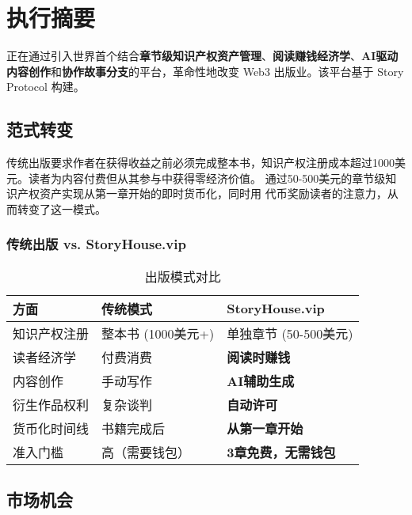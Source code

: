 \section{执行摘要}
\label{sec:executive-summary}

\storyhouse{} 正在通过引入世界首个结合\textbf{章节级知识产权资产管理}、\textbf{阅读赚钱经济学}、\textbf{AI驱动内容创作}和\textbf{协作故事分支}的平台，革命性地改变 Web3 出版业。该平台基于 Story Protocol 构建。

\subsection{范式转变}

\begin{innovation}
传统出版要求作者在获得收益之前必须完成整本书，知识产权注册成本超过1000美元。读者为内容付费但从其参与中获得零经济价值。\storyhouse{} 通过50-500美元的章节级知识产权资产实现从第一章开始的即时货币化，同时用 \tip{} 代币奖励读者的注意力，从而转变了这一模式。
\end{innovation}

\subsubsection{传统出版 vs. StoryHouse.vip}

\begin{table}[H]
\centering
\caption{出版模式对比}
\label{tab:publishing-comparison}
\begin{tabular}{@{}lll@{}}
\toprule
\textbf{方面} & \textbf{传统模式} & \textbf{StoryHouse.vip} \\
\midrule
知识产权注册 & 整本书 (1000美元+) & 单独章节 (50-500美元) \\
读者经济学 & 付费消费 & \textbf{阅读时赚钱} \\
内容创作 & 手动写作 & \textbf{AI辅助生成} \\
衍生作品权利 & 复杂谈判 & \textbf{自动许可} \\
货币化时间线 & 书籍完成后 & \textbf{从第一章开始} \\
准入门槛 & 高（需要钱包） & \textbf{3章免费，无需钱包} \\
\bottomrule
\end{tabular}
\end{table}

\subsection{市场机会}

